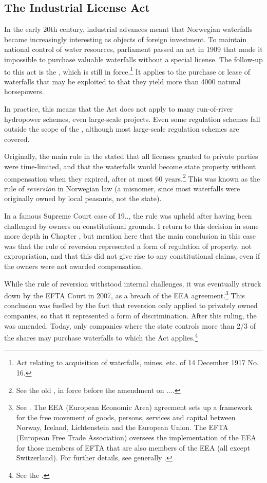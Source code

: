 \subsection{The Industrial License Act}\label{sec:ica17}

In the early 20th century, industrial advances meant that Norwegian waterfalls became increasingly interesting as objects of foreign investment. To maintain national control of water resources, parliament passed an act in 1909 that made it impossible to purchase valuable waterfalls without a special license. The follow-up to this act is the \cite{ica17}, which is still in force.\footnote{Act relating to acquisition of waterfalls, mines, etc. of 14 December 1917 No. 16.} It applies to the purchase or lease of waterfalls that may be exploited to that they yield more than 4000 natural horsepowers.

In practice, this means that the Act does not apply to many run-of-river hydropower schemes, even large-scale projects. Even some regulation schemes fall outside the scope of the \cite{ica17}, although most large-scale regulation schemes are covered.

Originally, the main rule in the \cite{ica17} stated that all licenses granted to private parties were time-limited, and that the waterfalls would become state property without compensation when they expired, after at most 60 years.\footnote{See the old \cite[2]{ica17}, in force before the amendment on ....} This was known as the rule of {\it reversion} in Norwegian law (a misnomer, since most waterfalls were originally owned by local peasants, not the state).

In a famous Supreme Court case of 19.., the rule was upheld after having been challenged by owners on constitutional grounds. I return to this decision in some more depth in Chapter \cite{chap:4}, but mention here that the main conclusion in this case was that the rule of reversion represented a form of regulation of property, not expropriation, and that this did not give rise to any constitutional claims, even if the owners were not awarded compensation.

While the rule of reversion withstood internal challenges, it was eventually struck down by the EFTA Court in 2007, as a breach of the EEA agreement.\footnote{See \cite{efta07}. The EEA (European Economic Area) agreement sets up a framework for the free movement of goods, persons, services and capital between Norway, Iceland, Lichtenstein and the European Union. The EFTA (European Free Trade Association) oversees the implementation of the EEA for those members of EFTA that are also members of the EEA (all except Switzerland). For further details, see generally \cite{bull94,magnussen02,fredriksen09}.} This conclusion was fuelled by the fact that reversion only applied to privately owned companies, so that it represented a form of discrimination. After this ruling, the \cite{ica17} was amended. Today, only companies where the state controls more than 2/3 of the shares may purchase waterfalls to which the Act applies.\footnote{See the \cite[2]{ica17}.}

